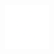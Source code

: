 \documentclass[
        a4paper, %
	8pt, %
]{CSSullivanBusinessReport}
\begin{document}
\pagecolor{bg}
\color{white}


\thispagestyle{empty} %

\begin{fullwidth} %
	\vspace*{-0.075\textheight} %

	\hfill\includegraphics[width=2cm]{Images/xenophon_inv.png} %
 
	\vspace{0.1\textheight} %

	\parbox{0.9\fulltextwidth}{\fontsize{40pt}{42pt}\selectfont\raggedright\reporttitle\par} %
	
	\vspace{0.03\textheight} %
	
	{\LARGE{\reportsubtitle}\par} %
	
	\vspace*{4.5in}%
	
	{\Large\reportauthors\par} %
	
	\vfill\vfill\vfill %

 
	{\large\reportdate\par} %
\end{fullwidth}

\newpage


\thispagestyle{empty} %
\end{document}
